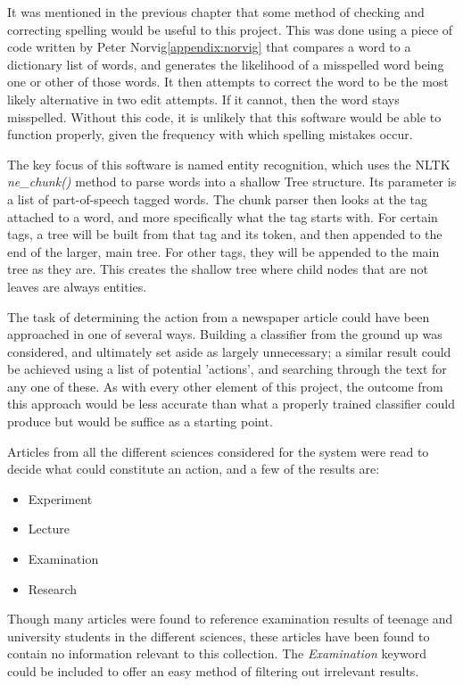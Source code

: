 \documentclass[11pt,a4paper]{book}
\begin{document}
It was mentioned in the previous chapter that some method of checking and correcting spelling would be useful to this project. This was done using a piece of code written by Peter Norvig\ref{appendix:norvig} that compares a word to a dictionary list of words, and generates the likelihood of a misspelled word being one or other of those words. It then attempts to correct the word to be the most likely alternative in two edit attempts. If it cannot, then the word stays misspelled. Without this code, it is unlikely that this software would be able to function properly, given the frequency with which spelling mistakes occur.

The key focus of this software is named entity recognition, which uses the NLTK \textit{ne\_chunk()} method to parse words into a shallow Tree structure. Its parameter is a list of part-of-speech tagged words. The chunk parser then looks at the tag attached to a word, and more specifically what the tag starts with. For certain tags, a tree will be built from that tag and its token, and then appended to the end of the larger, main tree. For other tags, they will be appended to the main tree as they are. This creates the shallow tree where child nodes that are not leaves are always entities. \cite{parser_documentation}

The task of determining the action from a newspaper article could have been approached in one of several ways. Building a classifier from the ground up was considered, and ultimately set aside as largely unnecessary; a similar result could be achieved using a list of potential 'actions', and searching through the text for any one of these. As with every other element of this project, the outcome from this approach would be less accurate than what a properly trained classifier could produce but would be suffice as a starting point.

Articles from all the different sciences considered for the system were read to decide what could constitute an action, and a few of the results are:
\begin{itemize}
\item Experiment
\item Lecture
\item Examination
\item Research
\end{itemize}
Though many articles were found to reference examination results of teenage and university students in the different sciences, these articles have been found to contain no information relevant to this collection. The \textit{Examination} keyword could be included to offer an easy method of filtering out irrelevant results. 
\end{document}
